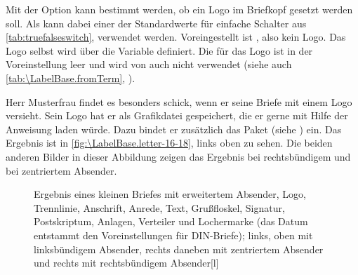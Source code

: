 \begin{Declaration}
\end{Declaration}
%
%
Mit der Option  kann bestimmt werden, ob ein Logo
im Briefkopf gesetzt werden soll. Als  kann dabei einer
der Standardwerte für einfache Schalter aus \autoref{tab:truefalseswitch},
 verwendet
werden. Voreingestellt ist , also kein
Logo. Das Logo selbst wird über die Variable 
definiert. Die  für das Logo ist in der Voreinstellung leer
und wird von \KOMAScript{} auch nicht verwendet (siehe auch
\autoref{tab:\LabelBase.fromTerm}, ).%
\begin{Example}
  Herr Musterfrau findet es besonders schick, wenn er seine Briefe mit einem
  Logo versieht. Sein Logo hat er als Grafikdatei gespeichert, die er gerne
  mit Hilfe der Anweisung  laden würde. Dazu bindet er
  zusätzlich das Paket  (siehe
  \cite{package:graphics}) ein.%
  Das Ergebnis ist in \autoref{fig:\LabelBase.letter-16-18},
   links oben zu sehen. Die beiden
  anderen Bilder in dieser Abbildung zeigen das Ergebnis bei rechtsbündigem
  und bei zentriertem Absender.
  \begin{figure}
     \setcapindent{0pt}%
     {\hfill
       \quad
       \par\bigskip}
     \begin{captionbeside}{Ergebnis eines kleinen Briefes mit
         erweitertem Absender, Logo, Trennlinie, Anschrift, Anrede, Text,
         Grußfloskel, Signatur, Postskriptum, Anlagen, Verteiler und
         Lochermarke (das Datum entstammt den Voreinstellungen für
         DIN-Briefe); links, oben mit linksbündigem Absender, rechts daneben
         mit zentriertem Absender und rechts mit rechtsbündigem Absender}[l]
       \quad
  \end{captionbeside}
  \label{fig:\LabelBase.letter-16-18}
  \end{figure}
\end{Example}%
%
\EndIndexGroup



